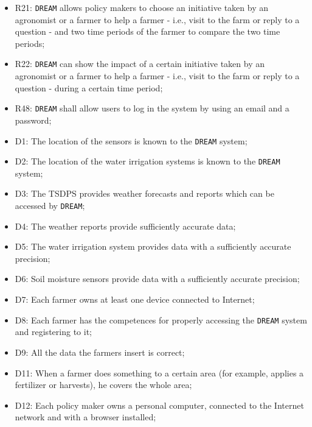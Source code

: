 \documentclass{article}
\begin{document}
\begin{itemize}
    \item R21: \verb|DREAM| allows policy makers to choose an initiative taken by an agronomist or a farmer to help a farmer - i.e., visit to the farm or reply to a question - and two time periods of the farmer to compare the two time periods;

    \item R22: \verb|DREAM| can show the impact of a certain initiative taken by an agronomist or a farmer to help a farmer - i.e., visit to the farm or reply to a question - during a certain time period;
    
    \item R48: \verb|DREAM| shall allow users to log in the system by using an email and a password;
    
    \item D1: The location of the sensors is known to the \verb|DREAM| system;
    
    \item D2: The location of the water irrigation systems is known to the \verb|DREAM| system;
    
    \item D3: The TSDPS provides weather forecasts and reports which can be accessed by \verb|DREAM|;
    
    \item D4: The weather reports provide sufficiently accurate data;
    
    \item D5: The water irrigation system provides data with a sufficiently accurate precision;
    
    \item D6: Soil moisture sensors provide data with a sufficiently accurate precision;
    
    \item D7: Each farmer owns at least one device connected to Internet;
    
    \item D8: Each farmer has the competences for properly accessing the \verb|DREAM| system and registering to it;
    
    \item D9: All the data the farmers insert is correct;
    
    \item D11: When a farmer does something to a certain area (for example, applies a fertilizer or harvests), he covers the whole area;
    
    \item D12: Each policy maker owns a personal computer, connected to the Internet network and with a browser installed;
    

\end{itemize}
\end{document}
